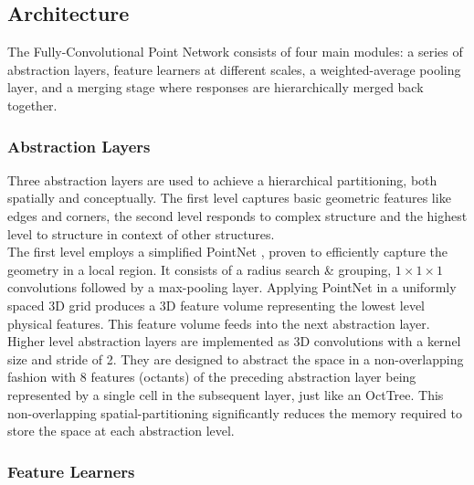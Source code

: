 \documentclass[runningheads]{llncs}
\begin{document}
\subsection{Architecture}

The Fully-Convolutional Point Network consists of four main modules: a series of abstraction layers, feature learners at different scales, a weighted-average pooling layer, and a merging stage where responses are hierarchically merged back together.

\subsubsection{Abstraction Layers}
Three abstraction layers are used to achieve a hierarchical partitioning, both spatially and conceptually. The first level captures basic geometric features like edges and corners, the second level responds to complex structure and the highest level to structure in context of other structures.\\


The first level employs a simplified PointNet \cite{Qi2017_2}, proven to efficiently capture the geometry in a local region. It consists of a radius search \& grouping, $1\times1\times1$ convolutions followed by a max-pooling layer. Applying PointNet in a uniformly spaced 3D grid produces a 3D feature volume representing the lowest level physical features. This feature volume feeds into the next abstraction layer. Higher level abstraction layers are implemented as 3D convolutions with a kernel size and stride of 2. They are designed to abstract the space in a non-overlapping fashion with 8 features (octants) of the preceding abstraction layer being represented by a single cell in the subsequent layer, just like an OctTree. This non-overlapping spatial-partitioning significantly reduces the memory required to store the space at each abstraction level.

\subsubsection{Feature Learners}
\end{document}
